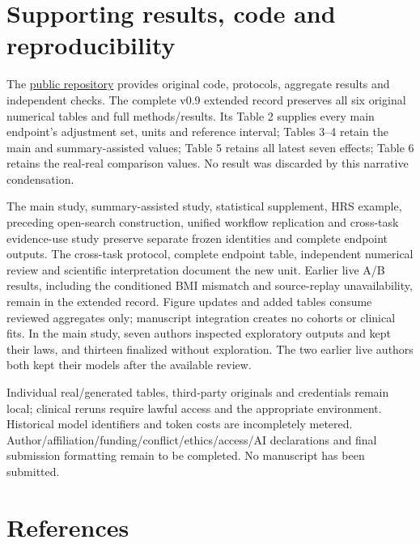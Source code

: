 \documentclass[10pt,twocolumn]{article}
\begin{document}
\section{Supporting results, code and reproducibility}

The \href{https://github.com/ziwang11112/evidence-guided-virtual-cohorts-2026}{public repository} provides original code, protocols, aggregate results and independent checks. The complete v0.9 extended record preserves all six original numerical tables and full methods/results. Its Table 2 supplies every main endpoint's adjustment set, units and reference interval; Tables 3–4 retain the main and summary-assisted values; Table 5 retains all latest seven effects; Table 6 retains the real-real comparison values. No result was discarded by this narrative condensation.


The main study, summary-assisted study, statistical supplement, HRS example, preceding open-search construction, unified workflow replication and cross-task evidence-use study preserve separate frozen identities and complete endpoint outputs. The cross-task protocol, complete endpoint table, independent numerical review and scientific interpretation document the new unit. Earlier live A/B results, including the conditioned BMI mismatch and source-replay unavailability, remain in the extended record. Figure updates and added tables consume reviewed aggregates only; manuscript integration creates no cohorts or clinical fits. In the main study, seven authors inspected exploratory outputs and kept their laws, and thirteen finalized without exploration. The two earlier live authors both kept their models after the available review.


Individual real/generated tables, third-party originals and credentials remain local; clinical reruns require lawful access and the appropriate environment. Historical model identifiers and token costs are incompletely metered. Author/affiliation/funding/conflict/ethics/access/AI declarations and final submission formatting remain to be completed. No manuscript has been submitted.


\clearpage

\section*{References}

\begingroup\fontsize{8.5}{10}\selectfont
\end{document}
